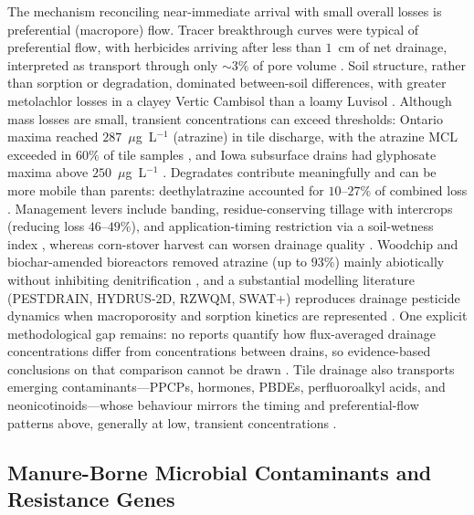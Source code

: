 The mechanism reconciling near-immediate arrival with small overall losses is
preferential (macropore) flow. Tracer breakthrough curves were typical of
preferential flow, with herbicides arriving after less than $1$~cm of net
drainage, interpreted as transport through only $\sim3\%$ of pore volume
\parencite{Fortin2002,Dousset2004}. Soil structure, rather than sorption or
degradation, dominated between-soil differences, with greater metolachlor
losses in a clayey Vertic Cambisol than a loamy Luvisol
\parencite{Novak2001,Novak2003}. Although mass losses are small, transient
concentrations can exceed thresholds: Ontario maxima reached
$287$~$\mu$g~L$^{-1}$ (atrazine) in tile discharge, with the atrazine MCL
exceeded in $60\%$ of tile samples \parencite{GAYNOR1995}, and Iowa subsurface
drains had glyphosate maxima above $250$~$\mu$g~L$^{-1}$ \parencite{Coupe2012}.
Degradates contribute meaningfully and can be more mobile than parents:
deethylatrazine accounted for $10$--$27\%$ of combined loss
\parencite{GAYNOR1995,MUIR1978,JAYACHANDRAN1994}. Management levers include
banding, residue-conserving tillage with intercrops (reducing loss
$46$--$49\%$), and application-timing restriction via a soil-wetness index
\parencite{Gaynor2001,Julien2023,Moorman1999}, whereas corn-stover harvest can
worsen drainage quality \parencite{Shipitalo2016}. Woodchip and
biochar-amended bioreactors removed atrazine (up to $93\%$) mainly abiotically
without inhibiting denitrification \parencite{Hassanpour2019,Ilhan2011}, and a
substantial modelling literature (PESTDRAIN, HYDRUS-2D, RZWQM, SWAT+)
reproduces drainage pesticide dynamics when macroporosity and sorption
kinetics are represented
\parencite{Branger2009,Boivin2006,Shipitalo2016,Wendell2024,Novak2003}. One
explicit methodological gap remains: no reports quantify how flux-averaged
drainage concentrations differ from concentrations between drains, so
evidence-based conclusions on that comparison cannot be drawn
\parencite{Jacobsen2007}. Tile drainage also transports emerging
contaminants---PPCPs, hormones, PBDEs, perfluoroalkyl acids, and
neonicotinoids---whose behaviour mirrors the timing and preferential-flow
patterns above, generally at low, transient concentrations
\parencite{Gottschall2012,Gottschall2013,Gottschall2017,Ghirardini2019,Schaafsma2019}.

\subsection{Manure-Borne Microbial Contaminants and Resistance Genes}

